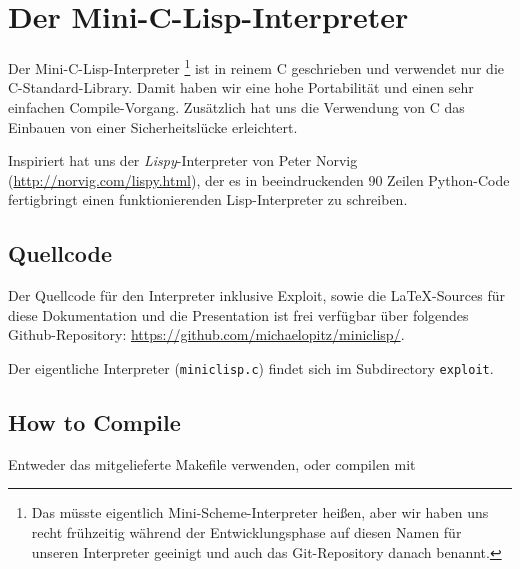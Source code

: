 \section[Mini-C-Lisp]{Der Mini-C-Lisp-Interpreter}
Der Mini-C-Lisp-Interpreter  \footnote{Das müsste eigentlich Mini-Scheme-Interpreter heißen, aber wir
  haben uns recht frühzeitig während der Entwicklungsphase auf diesen Namen
  für unseren Interpreter geeinigt und auch das Git-Repository danach benannt.
} ist in reinem C geschrieben und verwendet nur die
C-Standard-Library. Damit haben wir eine hohe Portabilität und einen sehr
einfachen Compile-Vorgang. Zusätzlich hat uns die Verwendung von C das Einbauen
von einer Sicherheitslücke erleichtert.
\par
\label{lispy}
Inspiriert hat uns der \emph{Lispy}-Interpreter von Peter Norvig
(\url{http://norvig.com/lispy.html}), der es in beeindruckenden 90 Zeilen Python-Code
fertigbringt einen funktionierenden Lisp-Interpreter zu schreiben.

\subsection[Quellcode]{Quellcode}
Der Quellcode für den Interpreter inklusive Exploit, sowie die \LaTeX-Sources
für diese Dokumentation und die Presentation ist frei verfügbar 
über folgendes Github-Repository: 
\url{https://github.com/michaelopitz/miniclisp/}.
\par
Der eigentliche Interpreter (\texttt{miniclisp.c}) findet sich im Subdirectory
\texttt{exploit}.
\par

\subsection[Compiling]{How to Compile}
Entweder das mitgelieferte Makefile verwenden, oder compilen mit


